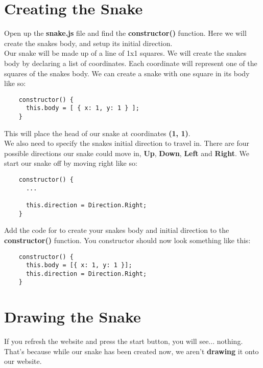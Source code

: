 \documentclass{article}
\begin{document}
  \pagebreak
  \section{Creating the Snake}
  Open up the \textbf{snake.js} file and find the \textbf{constructor()} function. Here we
  will create the snakes body, and setup its initial direction. \\

  \noindent Our snake will be made up of a line of 1x1 squares. We will create the snakes body by
  declaring a list of coordinates. Each coordinate will represent one of the squares of 
  the snakes body. We can create a snake with one square in its body like so:

  \begin{verbatim}
    constructor() {
      this.body = [ { x: 1, y: 1 } ];
    }
  \end{verbatim}

  \noindent This will place the head of our snake at coordinates \textbf{(1, 1)}. \\

  \noindent We also need to specify the snakes initial direction to travel in. There are 
  four possible directions our snake could move in, \textbf{Up}, \textbf{Down}, \textbf{Left} 
  and \textbf{Right}. We start our snake off by moving right like so:

  \begin{verbatim}
    constructor() {
      ...

      this.direction = Direction.Right;
    }
  \end{verbatim}

  \noindent Add the code for to create your snakes body and initial direction to the
  \textbf{constructor()} function. You constructor should now look something like this:

  \begin{verbatim}
    constructor() {
      this.body = [{ x: 1, y: 1 }];
      this.direction = Direction.Right;
    }
  \end{verbatim}

  \pagebreak
  \section{Drawing the Snake}
  If you refresh the website and press the start button, you will see... nothing. 
  That's because while our snake has been created now, we aren't \textbf{drawing} it onto
  our website. \\
\end{document}
